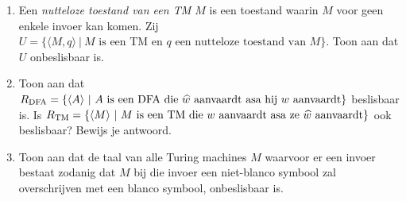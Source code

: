 \documentclass[a4paper]{article}
\begin{document}
\begin{enumerate}
\item Een \emph{nutteloze toestand van een TM $M$} is een toestand waarin $M$ voor geen enkele invoer kan komen. Zij $U = \{ \langle M, q \rangle \ | \ \text{$M$ is een TM en $q$ een nutteloze toestand van $M$} \}$. Toon aan dat $U$ onbeslisbaar is.
\item Toon aan dat $R_{\rm DFA} = \{ \langle A \rangle \ | \ \text{$A$ is een DFA die $\widehat{w}$ aanvaardt asa hij $w$ aanvaardt} \}$ beslisbaar is. Is $R_{\rm TM} = \{ \langle M \rangle \ | \ \text{$M$ is een TM die $w$ aanvaardt asa ze $\widehat{w}$ aanvaardt} \}$ ook beslisbaar? Bewijs je antwoord.
\item Toon aan dat de taal van alle Turing machines $M$ waarvoor er een invoer bestaat zodanig dat $M$ bij die invoer een niet-blanco symbool zal overschrijven met een blanco symbool, onbeslisbaar is.
\end{enumerate}
\end{document}
